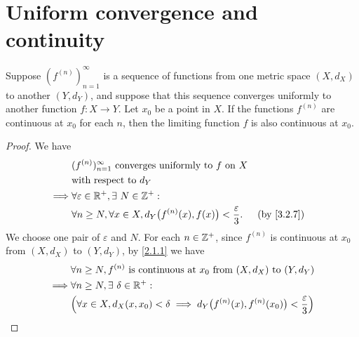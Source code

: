 \section{Uniform convergence and continuity}\label{sec:3.3}

\begin{thm}\label{3.3.1}
  Suppose \((f^{(n)})_{n = 1}^\infty\) is a sequence of functions from one metric space \((X, d_X)\) to another \((Y, d_Y)\), and suppose that this sequence converges uniformly to another function \(f : X \to Y\).
  Let \(x_0\) be a point in \(X\).
  If the functions \(f^{(n)}\) are continuous at \(x_0\) for each \(n\), then the limiting function \(f\) is also continuous at \(x_0\).
\end{thm}

\begin{proof}
  We have
  \begin{align*}
             & (f^{(n)})_{n = 1}^\infty \text{ converges uniformly to } f \text{ on } X                                                 \\
             & \text{with respect to } d_Y                                                                                              \\
    \implies & \forall \varepsilon \in \R^+, \exists\ N \in \Z^+ :                                                                      \\
             & \forall n \geq N, \forall x \in X, d_Y\big(f^{(n)}(x), f(x)\big) < \dfrac{\varepsilon}{3}. &  & \text{(by \cref{3.2.7})}
  \end{align*}
  We choose one pair of \(\varepsilon\) and \(N\).
  For each \(n \in \mathbb{Z}^+\), since \(f^{(n)}\) is continuous at \(x_0\) from \((X, d_X)\) to \((Y, d_Y)\), by \cref{2.1.1} we have
  \begin{align*}
             & \forall n \geq N, f^{(n)} \text{ is continuous at } x_0 \text{ from } (X, d_X) \text{ to } (Y, d_Y)                                                                                            \\
    \implies & \forall n \geq N, \exists\ \delta \in \R^+ :                                                                                                                                                   \\
             & \Big(\forall x \in X, d_X(x, x_0) < \delta \implies d_Y\big(f^{(n)}(x), f^{(n)}(x_0)\big) < \dfrac{\varepsilon}{3}\Big)                                                                        \\

\end{align*}
\end{proof}
